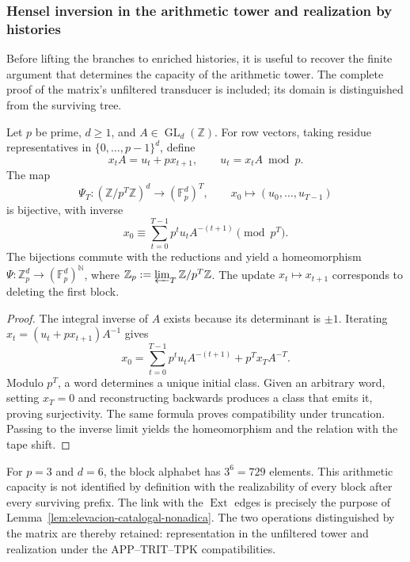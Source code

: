 \subsubsection{Hensel inversion in the arithmetic tower and realization by histories}
\label{sec:ch-capacidad-hensel}

Before lifting the branches to enriched histories, it is useful to recover the
finite argument that determines the capacity of the arithmetic tower. The
complete proof of the matrix's unfiltered transducer is included; its domain
is distinguished from the surviving tree.

\begin{proposition}
\label{prop:ch-hensel-bruto}
Let \(p\) be prime, \(d\geq1\), and \(A\in\operatorname{GL}_d(\mathbb Z)\).
For row vectors, taking residue representatives in
\(\{0,\ldots,p-1\}^d\), define
\[
 x_tA=u_t+px_{t+1},\qquad u_t=x_tA\bmod p.
\]
The map
\[
 \Psi_T:(\mathbb Z/p^T\mathbb Z)^d\longrightarrow
             (\mathbb F_p^d)^T,\qquad
 x_0\longmapsto(u_0,\ldots,u_{T-1})
\]
is bijective, with inverse
\[
 x_0\equiv\sum_{t=0}^{T-1}p^tu_tA^{-(t+1)}\pmod{p^T}.
\]
The bijections commute with the reductions and yield a homeomorphism
\(\Psi:\mathbb Z_p^d\to(\mathbb F_p^d)^{\mathbb N}\), where
\(\mathbb Z_p:=\varprojlim_T\mathbb Z/p^T\mathbb Z\). The update
\(x_t\mapsto x_{t+1}\) corresponds to deleting the first block.
\end{proposition}

\begin{proof}
The integral inverse of \(A\) exists because its determinant is \(\pm1\).
Iterating \(x_t=(u_t+px_{t+1})A^{-1}\) gives
\[
 x_0=\sum_{t=0}^{T-1}p^tu_tA^{-(t+1)}+p^Tx_TA^{-T}.
\]
Modulo \(p^T\), a word determines a unique initial class. Given an arbitrary
word, setting \(x_T=0\) and reconstructing backwards produces a class that
emits it, proving surjectivity. The same formula proves compatibility under
truncation. Passing to the inverse limit yields the homeomorphism and the
relation with the tape shift.
\end{proof}

For \(p=3\) and \(d=6\), the block alphabet has \(3^6=729\) elements.
This arithmetic capacity is not identified by definition with the
realizability of every block after every surviving prefix. The link with the
\(\operatorname{Ext}\) edges is precisely the purpose of
Lemma~\ref{lem:elevacion-catalogal-nonadica}. The two operations distinguished
by the matrix are thereby retained: representation in the unfiltered tower
and realization under the APP--TRIT--TPK compatibilities.
